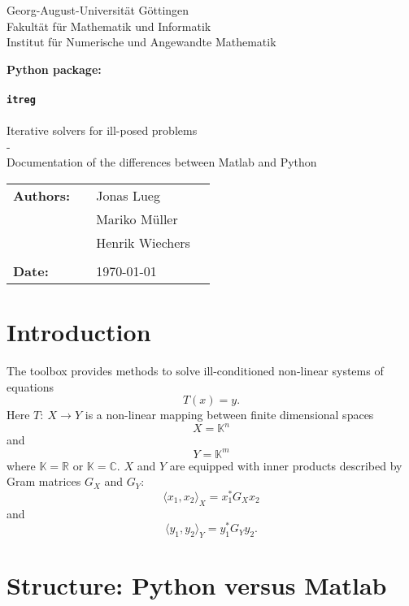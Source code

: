 \documentclass[12pt]{scrartcl}
\begin{document}
\thispagestyle{empty}
\begin{center}
\Large{Georg-August-Universität Göttingen}\\
\Large{Fakultät für Mathematik und Informatik}\\
\Large{Institut für Numerische und Angewandte Mathematik}
\end{center}
\vspace*{3cm}
\begin{center}
\textbf{Python package:}\\
~\\
\textbf{\texttt{\Huge{itreg}}}\\
~\\
Iterative solvers for ill-posed problems\\
-\\
Documentation of the differences between Matlab and Python\\
\end{center}
\vspace*{8cm}
\begin{flushleft}
\begin{tabular}{llll}
\textbf{Authors:} & & Jonas Lueg&\\
& & Mariko Müller & \\
& & Henrik Wiechers & \\
& & \\
\textbf{Date:} & & \today &\\
\end{tabular}
\end{flushleft}

\newpage
\thispagestyle{empty}
\tableofcontents

\newpage
{}
\section{Introduction}
The toolbox provides methods to solve ill-conditioned non-linear systems of equations
$$T(x) = y.$$
Here  $T:~X \rightarrow Y$ is a non-linear mapping between finite dimensional spaces 
$$X = \mathbb{K}^n$$
and
$$Y = \mathbb{K}^m$$
where  $\mathbb{K}=\mathbb{R}$ or  $\mathbb{K}=\mathbb{C}$. $X$ and  $Y$ are equipped with inner products described by Gram matrices  $G_X$ and  $G_Y$:
$$\langle x_1,x_2 \rangle_X = x_1^\ast G_X x_2$$
and
$$\langle y_1,y_2 \rangle_Y = y_1^\ast G_Y y_2.$$
\section{Structure: Python versus Matlab}
\end{document}
